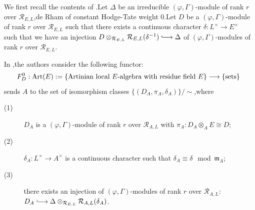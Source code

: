 \documentclass[SecEq,CM,GP]{degruyter-crelle} %
\theoremstyle{plain}
\newcommand{\hooklongrightarrow}{\lhook\joinrel\longrightarrow}
\newcommand{\Art}{{\rm Art}}
\newcommand{\fil}{{\rm Fil}}
\newcommand{\gr}{{\rm gr}}
\newcommand{\Spec}{\rm Spec}
\newcommand{\sban}{{\left(\Spec\mathfrak{Z}_{\Omega}\right)^{\mathrm{rig}}}}
\newcommand{\tee}{{{\otimes}_{\cR_{E,L}}}}
\newcommand{\undel}{{\delta}}
\newcommand{\ul}{\underline}
\newcommand{\zlch}{{\bZ_{\bL_{\ul{n}}}(\cO_L)}}
\newcommand{\bL}{{\mathbf{L}}}
\newcommand{\bZ}{{\mathbf{Z}}}
\newcommand{\cR}{\mathcal R}
\newcommand{\cF}{\mathcal F}
\newcommand{\cO}{\mathcal O}
\newcommand{\sD}{\mathscr D}
\begin{document}
We first recall the contents of \cite[Section 4.1.1]{Ding2021}.\;Let $\Delta$ be an irreducible $(\varphi,\Gamma)$-module of rank $r$ over $\cR_{E,L}$,\;de Rham of constant Hodge-Tate weight $0$.\;Let $D$ be a $(\varphi,\Gamma)$-module of rank $r$ over $\cR_{E,L}$ such that there exists a continuous character $\delta: L^\times\rightarrow E^\times$ such that we have an injection $D\otimes_{\cR_{E,L}}\cR_{E,L}({\delta}^{-1})\hooklongrightarrow {\Delta}$ of $(\varphi,\Gamma)$-modules of rank $r$ over $\cR_{E,L}$.\;

In \cite[Section 4.1.1]{Ding2021},\;the authors consider the following functor:
\[F_{D}^0:\Art(E):=\{\text{Artinian local $E$-algebra with residue field $E$}\}\longrightarrow \{\text{sets}\}\]
sends $A$ to the set of isomorphism classes $\{(D_A,\pi_A,\delta_A)\}/\sim$,\;where
\begin{description}
\item[(1)] $D_A$ is a $(\varphi,\Gamma)$-module of rank $r$ over $\cR_{A,L}$ with $\pi_A:D_A\otimes_AE\cong D$;
\item[(2)] ${\delta}_{A}:L^\times\rightarrow A^\times$ is a continuous character such that ${\delta}_{A}\equiv {\delta}\mod \mathfrak{m}_A$;
\item[(3)] there exists an injection of $(\varphi,\Gamma)$-modules of rank $r$ over $\cR_{A,L}$:\;\;$D_A\hooklongrightarrow {\Delta}\otimes_{\cR_{E,L}}\cR_{A,L}({\delta}_{A})$.
\end{description}
\end{document}
